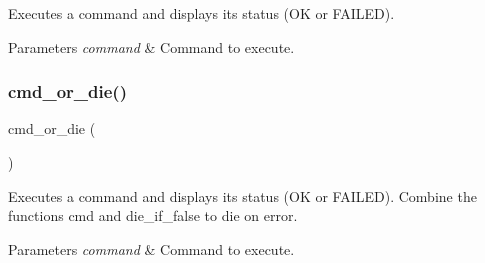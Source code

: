 Executes a command and displays its status (\textquotesingle{}OK\textquotesingle{} or \textquotesingle{}F\+A\+I\+L\+ED\textquotesingle{}). 


\begin{DoxyParams}{Parameters}
{\em command} & Command to execute. \\
\hline
\end{DoxyParams}
\mbox{\label{group__command_ga11d55e4afce37b27eb723d25fd4bf00e}} 
\subsubsection{\texorpdfstring{cmd\+\_\+or\+\_\+die()}{cmd\_or\_die()}}
{\footnotesize\ttfamily cmd\+\_\+or\+\_\+die (\begin{DoxyParamCaption}\item[{command}]{ }\end{DoxyParamCaption})}



Executes a command and displays its status (\textquotesingle{}OK\textquotesingle{} or \textquotesingle{}F\+A\+I\+L\+ED\textquotesingle{}). Combine the functions {\ttfamily cmd} and {\ttfamily die\+\_\+if\+\_\+false} to die on error. 


\begin{DoxyParams}{Parameters}
{\em command} & Command to execute. \\
\hline
\end{DoxyParams}
